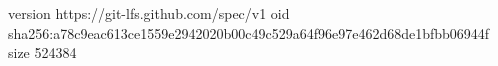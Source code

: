 version https://git-lfs.github.com/spec/v1
oid sha256:a78c9eac613ce1559e2942020b00c49c529a64f96e97e462d68de1bfbb06944f
size 524384
